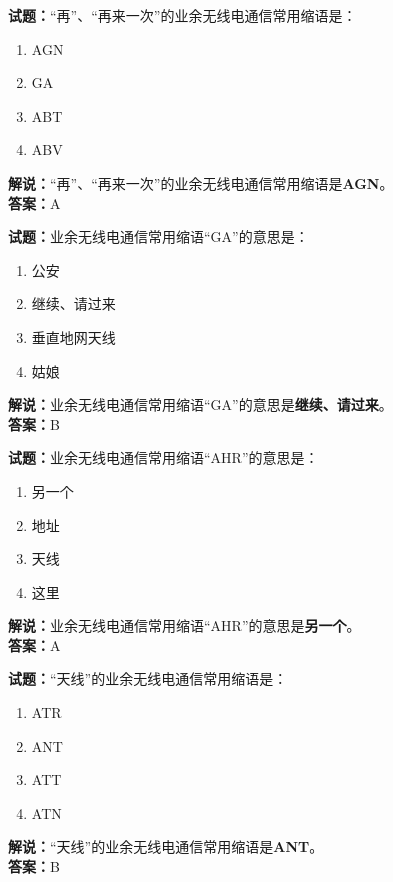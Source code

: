 \documentclass{ctexbook}
\begin{document}
\vspace{1em}

\textbf{试题：}“再”、“再来一次”的业余无线电通信常用缩语是：
\begin{enumerate}[leftmargin=3em]
  \item AGN
  \item GA
  \item ABT
  \item ABV
\end{enumerate}
\noindent\textbf{解说：}“再”、“再来一次”的业余无线电通信常用缩语是\textbf{AGN}。\\\noindent\textbf{答案：}A

\vspace{1em}

\textbf{试题：}业余无线电通信常用缩语“GA”的意思是：
\begin{enumerate}[leftmargin=3em]
  \item 公安
  \item 继续、请过来
  \item 垂直地网天线
  \item 姑娘
\end{enumerate}
\noindent\textbf{解说：}业余无线电通信常用缩语“GA”的意思是\textbf{继续、请过来}。\\\noindent\textbf{答案：}B

\vspace{1em}

\textbf{试题：}业余无线电通信常用缩语“AHR”的意思是：
\begin{enumerate}[leftmargin=3em]
  \item 另一个
  \item 地址
  \item 天线
  \item 这里
\end{enumerate}
\noindent\textbf{解说：}业余无线电通信常用缩语“AHR”的意思是\textbf{另一个}。\\\noindent\textbf{答案：}A

\vspace{1em}

\textbf{试题：}“天线”的业余无线电通信常用缩语是：
\begin{enumerate}[leftmargin=3em]
  \item ATR
  \item ANT
  \item ATT
  \item ATN
\end{enumerate}
\noindent\textbf{解说：}“天线”的业余无线电通信常用缩语是\textbf{ANT}。\\\noindent\textbf{答案：}B
\end{document}
